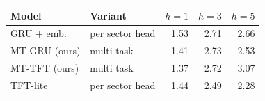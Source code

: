 \begin{tabular}{llrrr}
\toprule
Model & Variant & $h{=}1$ & $h{=}3$ & $h{=}5$ \\
\midrule
GRU + emb. & per sector head & 1.53 & 2.71 & 2.66 \\
MT-GRU (ours) & multi task & 1.41 & 2.73 & 2.53 \\
MT-TFT (ours) & multi task & 1.37 & 2.72 & 3.07 \\
TFT-lite & per sector head & 1.44 & 2.49 & 2.28 \\
\bottomrule
\end{tabular}
